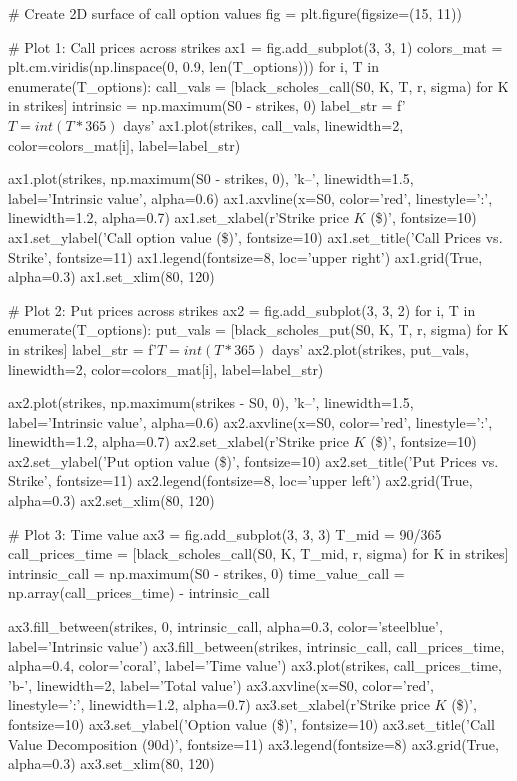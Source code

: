 \documentclass[a4paper, 11pt]{article}
\begin{document}
\begin{pycode}
# Create 2D surface of call option values
fig = plt.figure(figsize=(15, 11))

# Plot 1: Call prices across strikes
ax1 = fig.add_subplot(3, 3, 1)
colors_mat = plt.cm.viridis(np.linspace(0, 0.9, len(T_options)))
for i, T in enumerate(T_options):
    call_vals = [black_scholes_call(S0, K, T, r, sigma) for K in strikes]
    intrinsic = np.maximum(S0 - strikes, 0)
    label_str = f'$T={int(T*365)}$ days'
    ax1.plot(strikes, call_vals, linewidth=2, color=colors_mat[i], label=label_str)

ax1.plot(strikes, np.maximum(S0 - strikes, 0), 'k--', linewidth=1.5, label='Intrinsic value', alpha=0.6)
ax1.axvline(x=S0, color='red', linestyle=':', linewidth=1.2, alpha=0.7)
ax1.set_xlabel(r'Strike price $K$ (\$)', fontsize=10)
ax1.set_ylabel('Call option value (\$)', fontsize=10)
ax1.set_title('Call Prices vs. Strike', fontsize=11)
ax1.legend(fontsize=8, loc='upper right')
ax1.grid(True, alpha=0.3)
ax1.set_xlim(80, 120)

# Plot 2: Put prices across strikes
ax2 = fig.add_subplot(3, 3, 2)
for i, T in enumerate(T_options):
    put_vals = [black_scholes_put(S0, K, T, r, sigma) for K in strikes]
    label_str = f'$T={int(T*365)}$ days'
    ax2.plot(strikes, put_vals, linewidth=2, color=colors_mat[i], label=label_str)

ax2.plot(strikes, np.maximum(strikes - S0, 0), 'k--', linewidth=1.5, label='Intrinsic value', alpha=0.6)
ax2.axvline(x=S0, color='red', linestyle=':', linewidth=1.2, alpha=0.7)
ax2.set_xlabel(r'Strike price $K$ (\$)', fontsize=10)
ax2.set_ylabel('Put option value (\$)', fontsize=10)
ax2.set_title('Put Prices vs. Strike', fontsize=11)
ax2.legend(fontsize=8, loc='upper left')
ax2.grid(True, alpha=0.3)
ax2.set_xlim(80, 120)

# Plot 3: Time value
ax3 = fig.add_subplot(3, 3, 3)
T_mid = 90/365
call_prices_time = [black_scholes_call(S0, K, T_mid, r, sigma) for K in strikes]
intrinsic_call = np.maximum(S0 - strikes, 0)
time_value_call = np.array(call_prices_time) - intrinsic_call

ax3.fill_between(strikes, 0, intrinsic_call, alpha=0.3, color='steelblue', label='Intrinsic value')
ax3.fill_between(strikes, intrinsic_call, call_prices_time, alpha=0.4, color='coral', label='Time value')
ax3.plot(strikes, call_prices_time, 'b-', linewidth=2, label='Total value')
ax3.axvline(x=S0, color='red', linestyle=':', linewidth=1.2, alpha=0.7)
ax3.set_xlabel(r'Strike price $K$ (\$)', fontsize=10)
ax3.set_ylabel('Option value (\$)', fontsize=10)
ax3.set_title('Call Value Decomposition (90d)', fontsize=11)
ax3.legend(fontsize=8)
ax3.grid(True, alpha=0.3)
ax3.set_xlim(80, 120)


\end{pycode}
\end{document}
